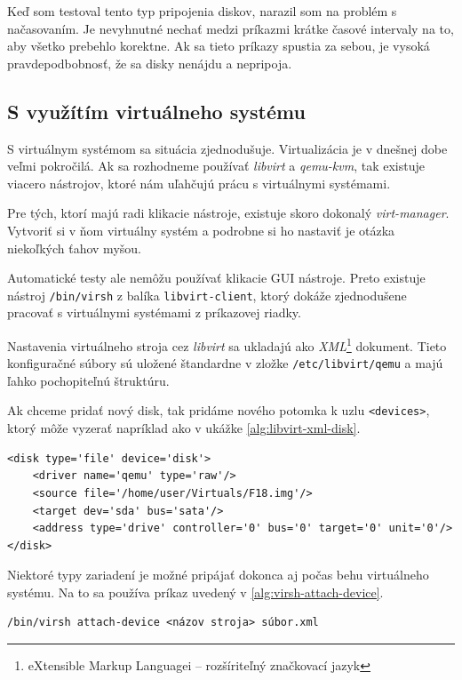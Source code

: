 Keď som testoval tento typ pripojenia diskov, narazil som na problém s
načasovaním. Je nevyhnutné nechať medzi príkazmi krátke časové intervaly na to,
aby všetko prebehlo korektne. Ak sa tieto príkazy spustia za sebou, je vysoká
pravdepodbobnosť, že sa disky nenájdu a nepripoja.

%
%

\subsection{S využítím virtuálneho systému}

S virtuálnym systémom sa situácia zjednodušuje. Virtualizácia je v dnešnej dobe
veľmi pokročilá. Ak sa rozhodneme používať \emph{libvirt} a \emph{qemu-kvm},
tak existuje viacero nástrojov, ktoré nám uľahčujú prácu s virtuálnymi
systémami.

Pre tých, ktorí majú radi klikacie nástroje, existuje skoro dokonalý
\emph{virt-manager}. Vytvoriť si v ňom virtuálny systém a podrobne si ho
nastaviť je otázka niekoľkých ťahov myšou. 

Automatické testy ale nemôžu používať klikacie GUI nástroje. Preto existuje
nástroj \texttt{/bin/virsh} z balíka \texttt{libvirt-client}, ktorý dokáže
zjednodušene pracovať s virtuálnymi systémami z príkazovej riadky.  

Nastavenia virtuálneho stroja cez \emph{libvirt} sa ukladajú ako
\emph{XML}\footnote{eXtensible Markup Languagei -- rozšíriteľný značkovací
jazyk} dokument. Tieto konfiguračné súbory sú uložené štandardne v zložke
\texttt{/etc/libvirt/qemu} a majú ľahko pochopiteľnú štruktúru.

Ak chceme pridať nový disk, tak pridáme nového potomka k uzlu
\texttt{<devices>}, ktorý môže vyzerať napríklad ako v ukážke
\ref{alg:libvirt-xml-disk}.
\\
\renewcommand{\lstlistingname}{Ukážka}
\begin{lstlisting}[label=alg:libvirt-xml-disk,caption=Príklad diskového zariadenia pre libvirt]
<disk type='file' device='disk'>
    <driver name='qemu' type='raw'/>
    <source file='/home/user/Virtuals/F18.img'/>
    <target dev='sda' bus='sata'/>
    <address type='drive' controller='0' bus='0' target='0' unit='0'/>
</disk>
\end{lstlisting}
\renewcommand{\lstlistingname}{\listingAlgoritmus}

Niektoré typy zariadení je možné pripájať dokonca aj počas behu virtuálneho
systému. Na to sa používa príkaz uvedený v \ref{alg:virsh-attach-device}.
\\
\begin{lstlisting}[label=alg:virsh-attach-device,caption=Pripojenie zariadenia bez priamej úpravy XML súbora]
/bin/virsh attach-device <názov stroja> súbor.xml
\end{lstlisting}

